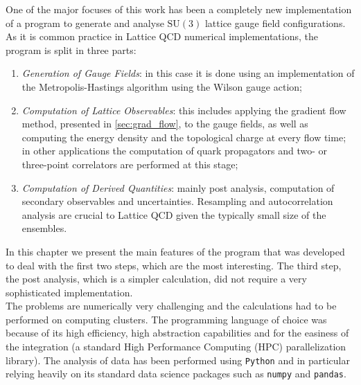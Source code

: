 One of the major focuses of this work has been a completely new implementation of a program to generate and analyse $\mathrm{SU}(3)$ lattice gauge field configurations. As it is common practice in Lattice QCD numerical implementations, the program is split in three parts:
\begin{enumerate}
    \item \textit{Generation of Gauge Fields}: in this case it is done using an implementation of the Metropolis-Hastings algorithm using the Wilson gauge action;
    \item \textit{Computation of Lattice Observables}: this includes applying the gradient flow method, presented in \cref{sec:grad_flow}, to the gauge fields, as well as computing the energy density and the topological charge at every flow time; in other applications the computation of quark propagators and two- or three-point correlators are performed at this stage; 
    \item \textit{Computation of Derived Quantities}: mainly post analysis, computation of secondary observables and uncertainties. Resampling and autocorrelation analysis are crucial to Lattice QCD given the typically small size of the ensembles. 
\end{enumerate}
In this chapter we present the main features of the program that was developed to deal with the first two steps, which are the most interesting. The third step, the post analysis, which is a simpler calculation, did not require a very sophisticated implementation. \\
The problems are numerically very challenging and the calculations had to be performed on computing clusters. The programming language of choice was \cpp because of its high efficiency, high abstraction capabilities and for the easiness of the \mpi integration (a standard High Performance Computing (HPC) parallelization library). The analysis of data has been performed using \texttt{Python} and in particular relying heavily on its standard data science packages such as \texttt{numpy} and \texttt{pandas}.
  

